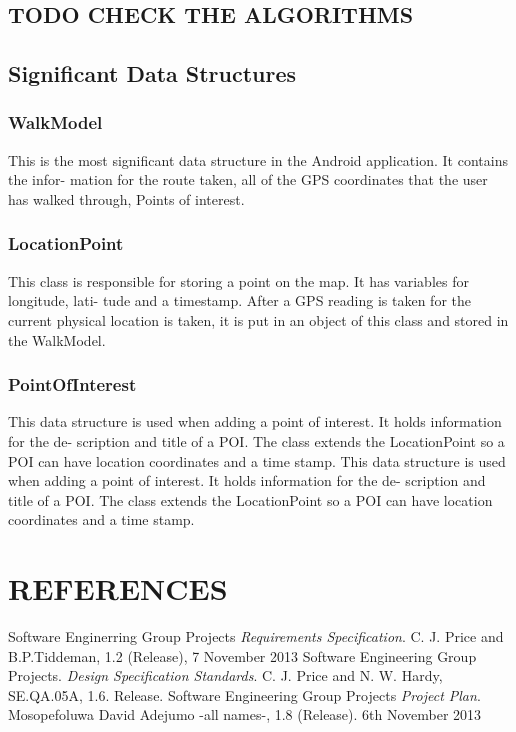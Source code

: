 \documentclass[12pt]{article}
\begin{document}
\subsection{TODO CHECK THE ALGORITHMS}
\subsection{Significant Data Structures}
\subsubsection{WalkModel}
This is the most significant data structure in the Android application. It contains the infor-
mation for the route taken,
all of the GPS coordinates that the user has walked through, Points of interest.
\subsubsection{LocationPoint}
This class is responsible for storing a point on the map. It has variables for longitude, lati-
tude and a timestamp.
After a GPS reading is taken for the current physical location is taken, it is put in an object
of this class and stored in the WalkModel.
\subsubsection{PointOfInterest}
This data structure is used when adding a point of interest. It holds information for the de-
scription and title of a POI.
The class extends the LocationPoint so a POI can have location coordinates and a time
stamp.
This data structure is used when adding a point of interest. It holds information for the de-
scription and title of a POI.
The class extends the LocationPoint so a POI can have location coordinates and a time
stamp.
\newpage 
\section{REFERENCES}
\begin{thebibliography}{0}
  Software Enginerring Group Projects
  \emph{Requirements Specification}.
   C. J. Price and B.P.Tiddeman, 
   1.2 (Release), 
   7 November 2013
Software Engineering Group Projects. 
\emph{Design Specification Standards}.
	C. J. Price and N. W. Hardy, 
	SE.QA.05A,
	1.6. Release.
Software Engineering Group Projects
\emph{ Project Plan}.
Mosopefoluwa David Adejumo -all names-, 1.8
(Release). 6th November 2013
\end{thebibliography}
\newpage
\end{document}
